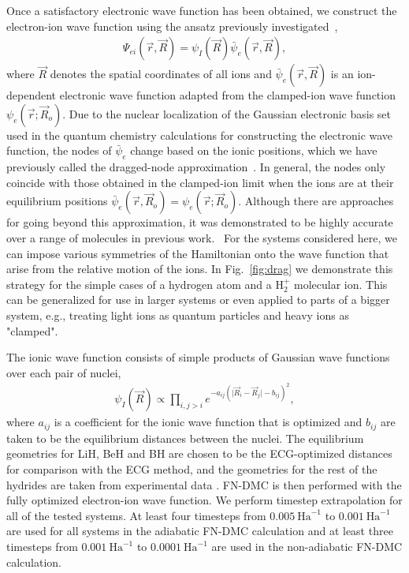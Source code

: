 \documentclass[pra,superscriptaddress,groupedaddress,twocolumn]{revtex4}
\begin{document}
Once a satisfactory electronic wave function has been obtained, we construct the electron-ion wave function using the ansatz previously investigated~\cite{Tubman_ECG},
\begin{align}
\Psi_{ei}(\vec{r},\vec{R})=\psi_I(\vec{R})\bar{\psi}_e(\vec{r},\vec{R}), \label{eq:psi}
\end{align}
where $\vec{R}$ denotes the spatial coordinates of all ions and $\bar{\psi}_e(\vec{r},\vec{R})$ is an ion-dependent electronic wave function adapted from the clamped-ion wave function $\psi_e(\vec{r};\vec{R}_o)$. Due to the nuclear localization of the Gaussian electronic basis set used in the quantum chemistry calculations for constructing the electronic wave function, the nodes of $\bar{\psi}_e$ change based on the ionic positions, which we have previously called the dragged-node approximation~\cite{Tubman_ECG}. In general, the nodes only coincide with those obtained in the clamped-ion limit when the ions are at their equilibrium positions $\bar{\psi}_e(\vec{r},\vec{R}_o)=\psi_e(\vec{r};\vec{R}_o)$. Although there are approaches for going beyond this approximation, it was demonstrated to be highly accurate over a range of molecules in previous work.~\cite{Tubman_ECG} For the systems considered here, we can impose various symmetries of the Hamiltonian onto the wave function that arise from the relative motion of the ions. In Fig.~\ref{fig:drag} we demonstrate this strategy for the simple cases of a hydrogen atom and a H$_2^+$ molecular ion. This can be generalized for use in larger systems or even applied to parts of a bigger system, e.g., treating light ions as quantum particles and heavy ions as "clamped".

The ionic wave function consists of simple products of Gaussian wave functions over each pair of nuclei,
\begin{align}
\psi_I(\vec{R})\propto \prod\limits_{i,j>i}e^{-a_{ij}(\vert \vec{R}_i-\vec{R}_j\vert-b_{ij})^2},
\label{wfs_ions}
\end{align}
where $a_{ij}$ is a coefficient for the ionic wave function that is optimized and $b_{ij}$ are taken to be the equilibrium distances between the nuclei. The equilibrium geometries for LiH, BeH and BH are chosen to be the ECG-optimized distances for comparison with the ECG method, and the geometries for the rest of the hydrides are taken from experimental data \cite{CCCBDB}. FN-DMC is then performed with the fully optimized electron-ion wave function. We perform timestep extrapolation for all of the tested systems. At least four timesteps from $0.005~\text{Ha}^{-1}$ to $0.001~\text{Ha}^{-1}$ are used for all systems in the adiabatic FN-DMC calculation and at least three timesteps from $0.001~\text{Ha}^{-1}$ to $0.0001~\text{Ha}^{-1}$ are used in the non-adiabatic FN-DMC calculation.
\end{document}
